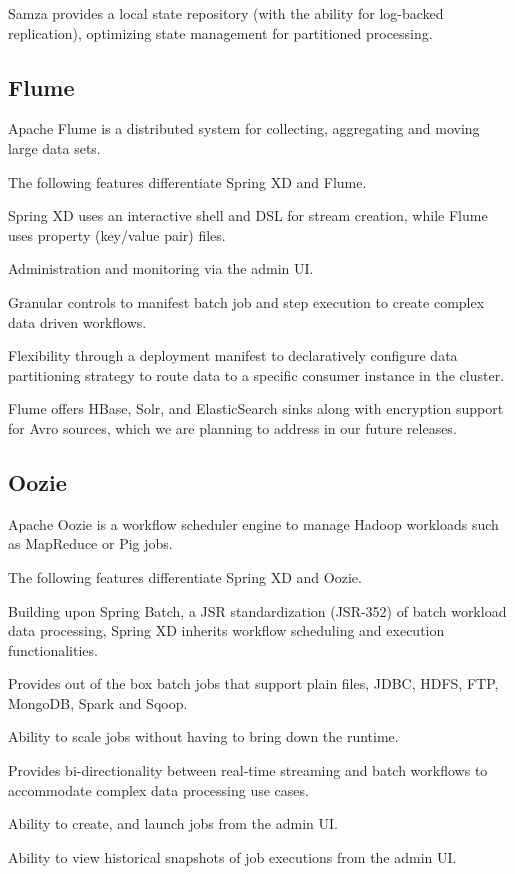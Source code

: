 Samza provides a local state repository (with the ability for log-backed replication),
optimizing state management for partitioned processing.

\subsection{Flume}
Apache Flume\cite{flume} is a distributed system for collecting, aggregating and
moving large data sets.

The following features differentiate Spring XD and Flume.

\begin{itemize*}
\item Spring XD uses an interactive shell and DSL for stream creation,
while Flume uses property (key/value pair) files.
\item Administration and monitoring via the admin UI.
\item Granular controls to manifest batch job and step execution to create
complex data driven workflows.
\item Flexibility through a deployment manifest to declaratively configure data
partitioning strategy to route data to a specific consumer instance in the cluster.
\end{itemize*}

Flume offers HBase, Solr, and ElasticSearch sinks along with encryption support
for Avro sources, which we are planning to address in our future releases.

\subsection{Oozie}
Apache Oozie\cite{oozie} is a workflow scheduler engine to manage Hadoop \cite{hadoop}
workloads such as MapReduce or Pig jobs.

The following features differentiate Spring XD and Oozie.

\begin{itemize*}
\item Building upon Spring Batch, a JSR standardization (JSR-352) of batch
workload data processing, Spring XD inherits workflow scheduling and execution
functionalities.
\item Provides out of the box batch jobs that support plain files, JDBC, HDFS,
FTP, MongoDB, Spark and Sqoop.
\item Ability to scale jobs without having to bring down the runtime.
\item Provides bi-directionality between real-time streaming and batch
workflows to accommodate complex data processing use cases.
\item Ability to create, and launch jobs from the admin UI.
\item Ability to view historical snapshots of job executions from the admin UI.
\end{itemize*}


